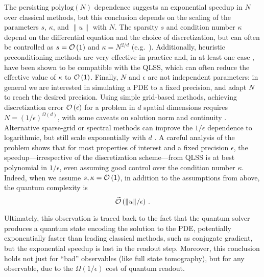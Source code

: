 \begin{refsection}
The persisting $\mathrm{polylog}(N)$ dependence suggests an exponential speedup in $N$ over classical methods, but this conclusion depends on the scaling of the parameters $s$, $\kappa$, and $\lVert u \rVert$ with $N$. The sparsity $s$ and condition number $\kappa$ depend on the differential equation and the choice of discretization, but can often be controlled as $s=\mathcal{O}\left( 1 \right)$ and $\kappa = N^{2/d}$ (e.g.~\cite[Theorem 9.7.1]{brenner2008mathematical}). Additionally, heuristic preconditioning methods are very effective in practice and, in at least one case \cite{clader2013preconditioned}, have been shown to be compatible with the QLSS, which can often reduce the effective value of $\kappa$ to $\mathcal{O}\left( 1 \right)$. 
Finally, $N$ and $\epsilon$ are not independent parameters: in general we are interested in simulating a PDE to a fixed precision, and adapt $N$ to reach the desired precision. Using simple grid-based methods, achieving discretization error $\mathcal{O}\left( \epsilon \right)$ for a problem in $d$ spatial dimensions requires $N = (1/\epsilon)^{\Omega(d)}$, with some caveats on solution norm and continuity \cite{montanaro2016quantum}. Alternative sparse-grid or spectral methods can improve the $1/\epsilon$ dependence to logarithmic, but still scale exponentially with $d$ \cite{childs2021high}. 
A careful analysis of the problem \cite{montanaro2016quantum} shows that for most properties of interest and a fixed precision $\epsilon$, the speedup---irrespective of the discretization scheme---from QLSS is at best polynomial in $1/\epsilon$, even assuming good control over the condition number $\kappa$. Indeed, when we assume $s,\kappa = \mathcal{O}\left( 1 \right)$, in addition to the assumptions from above, the quantum complexity is
\begin{equation}
    \widetilde{\mathcal{O}}\left( \lVert u \rVert/\epsilon \right)\,.
\end{equation}

Ultimately, this observation is traced back to the fact that the quantum solver produces a quantum state encoding the solution to the PDE, potentially exponentially faster than leading classical methods, such as conjugate gradient, but the exponential speedup is lost in the readout step. Moreover, this conclusion holds not just for ``bad'' observables (like full state tomography), but for any observable, due to the $\Omega(1/\epsilon)$ cost of quantum readout.\\



\end{refsection}
